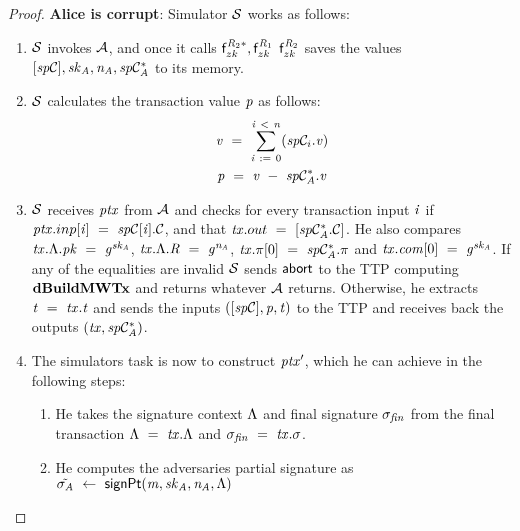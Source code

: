\begin{proof}
    \textbf{Alice is corrupt}: Simulator $\mathcal{S}$ works as follows:
    \begin{enumerate}
        \item $\mathcal{S}$ invokes $\mathcal{A}$, and once it calls $\mathsf{f}^{\mathit{R}_2*}_{zk}, \mathsf{f}^{\mathit{R}_1}_{zk}$ $\mathsf{f}^{\mathit{R}_2}_{zk}$ saves the values $[\mathit{sp}\mathcal{C}], \mathit{sk}_{\mathit{A}}, \mathit{\mathit{n}_{\mathit{A}}}, \mathit{sp}\mathcal{C}_{\mathit{A}}^*$ to its memory.
        \item $\mathcal{S}$ calculates the transaction value $\mathit{p}$ as follows:
        \begin{gather*}
            \mathit{v} ~=~ \sum_{\mathit{i} ~:=~ 0}^{\mathit{i} ~<~ \mathit{n}}(\mathit{sp}\mathcal{C}_i.\mathit{v}) \\
            \mathit{p} ~=~ \mathit{v} ~-~ \mathit{sp}\mathcal{C}_{\mathit{A}}^*.\mathit{v}
        \end{gather*}
        \item $\mathcal{S}$ receives $\mathit{ptx}$ from $\mathcal{A}$ and checks for every transaction input $\mathit{i}$ if $\mathit{ptx}.inp[\mathit{i}] ~=~ \mathit{sp}\mathcal{C}[\mathit{i}].\mathcal{C}$, and that $\mathit{tx}.out ~=~ [\mathit{sp}\mathcal{C}_{\mathit{A}}^*.\mathcal{C}]$.
        He also compares $\mathit{tx}.\Lambda.\mathit{pk} ~=~ \mathit{g}^{\mathit{sk}_{\mathit{A}}}$, $\mathit{tx}.\Lambda.\mathit{R} ~=~ \mathit{g}^{\mathit{\mathit{n}_{\mathit{A}}}}$, $\mathit{tx}.\pi[0] ~=~ \mathit{sp}\mathcal{C}_{\mathit{A}}^*.\pi$ and $\mathit{tx}.\mathit{com}[0] ~=~ \mathit{g}^{\mathit{sk}_{\mathit{A}}}$.
        If any of the equalities are invalid $\mathcal{S}$ sends $\mathsf{abort}$ to the TTP computing $\mathbf{dBuildMWTx}$ and returns whatever $\mathcal{A}$ returns.
        Otherwise, he extracts $\mathit{t} ~=~ \mathit{tx}.\mathit{t}$ and sends the inputs $([\mathit{sp}\mathcal{C}], \mathit{p}, \mathit{t})$ to the TTP and receives back the outputs $(\mathit{tx}, \mathit{sp}\mathcal{C}_{\mathit{A}}^*)$.
        \item The simulators task is now to construct ${\mathit{ptx}}'$, which he can achieve in the following steps:
        \begin{enumerate}
            \item He takes the signature context $\Lambda$ and final signature $\sigma_{\mathit{fin}}$ from the final transaction $\Lambda ~=~ \mathit{tx}.\Lambda$ and $\sigma_{\mathit{fin}} ~=~ \mathit{tx}.\sigma$.
            \item He computes the adversaries partial signature as $\tilde{\sigma_{\mathit{A}}} ~\leftarrow~ \mathsf{signPt}(\mathit{m}, \mathit{sk}_{\mathit{A}}, \mathit{\mathit{n}_{\mathit{A}}}, \Lambda)$

\end{enumerate}
\end{enumerate}
\end{proof}
